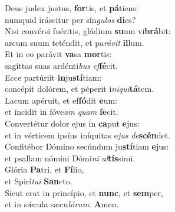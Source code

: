 \evenverse Deus judex justus, \textbf{for}tis, et \textbf{pá}tiens:~\*\\
\evenverse numquid iráscitur per sín\textit{gu}\textit{los} \textbf{di}es?\\
\oddverse Nisi convérsi fuéritis, gládium \textbf{su}um vi\textbf{brá}bit:~\*\\
\oddverse arcum suum teténdit, et pa\textit{rá}\textit{vit} \textbf{il}lum.\\
\evenverse Et in eo parávit \textbf{va}sa \textbf{mor}tis:~\*\\
\evenverse sagíttas suas ardénti\textit{bus} \textit{ef}\textbf{fé}cit.\\
\oddverse Ecce partúriit \textbf{in}ju\textbf{stí}tiam:~\*\\
\oddverse concépit dolórem, et péperit i\textit{ni}\textit{qui}\textbf{tá}tem.\\
\evenverse Lacum apéruit, et ef\textbf{fó}dit \textbf{e}um:~\*\\
\evenverse et íncidit in fóve\textit{am} \textit{quam} \textbf{fe}cit.\\
\oddverse Convertétur dolor ejus in \textbf{ca}put \textbf{e}jus:~\*\\
\oddverse et in vérticem ipsíus iníquitas e\textit{jus} \textit{de}\textbf{scén}det.\\
\evenverse Confitébor Dómino secúndum ju\textbf{stí}tiam \textbf{e}jus:~\*\\
\evenverse et psallam nómini Dómi\textit{ni} \textit{al}\textbf{tís}simi.\\
\oddverse Glória \textbf{Pa}tri, et \textbf{Fí}lio,~\*\\
\oddverse et Spirí\textit{tu}\textit{i} \textbf{San}cto.\\
\evenverse Sicut erat in princípio, et \textbf{nunc}, et \textbf{sem}per,~\*\\
\evenverse et in sǽcula sæcu\textit{ló}\textit{rum}. \textbf{A}men.\\

